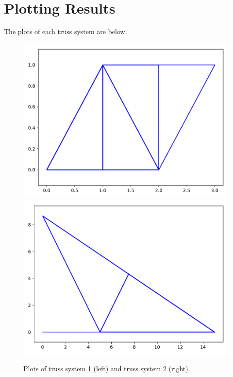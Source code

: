 \documentclass[11pt]{amsart}
\theoremstyle{definition}
\begin{document}
\section{Plotting Results}
The plots of each truss system are below.
\begin{figure}[h]
\centerline{\includegraphics[scale=.4]{Figure1.pdf} \includegraphics[scale=.4]{Figure2.pdf}}
\caption{Plots of truss system 1 (left) and truss system 2 (right).}
\end{figure}
\end{document}
